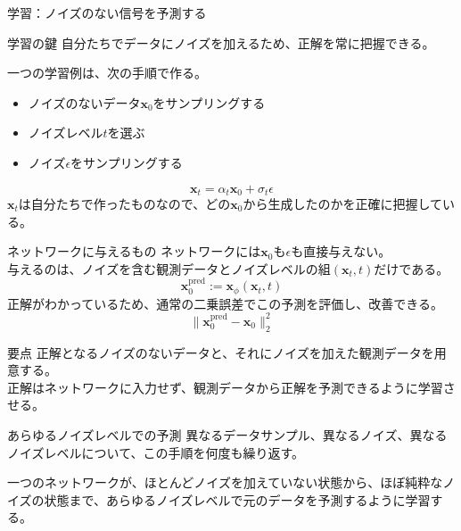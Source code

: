 \begin{frame}{学習：ノイズのない信号を予測する}
    \begin{block}{学習の鍵}
        自分たちでデータにノイズを加えるため、正解を常に把握できる。
    \end{block}
    一つの学習例は、次の手順で作る。
    \begin{itemize}
        \item ノイズのないデータ\(\boldsymbol{x}_{0}\)をサンプリングする
        \item ノイズレベル\(t\)を選ぶ
        \item ノイズ\(\epsilon\)をサンプリングする
    \end{itemize}
    \[
        \boldsymbol{x}_{t}=\alpha_{t}\boldsymbol{x}_{0}+\sigma_{t}\epsilon
    \]
    \(\boldsymbol{x}_{t}\)は自分たちで作ったものなので、どの\(\boldsymbol{x}_{0}\)から生成したのかを正確に把握している。
\end{frame}
\begin{frame}{ネットワークに与えるもの}
    ネットワークには\(\boldsymbol{x}_{0}\)も\(\epsilon\)も直接与えない。\\
    与えるのは、ノイズを含む観測データとノイズレベルの組\((\boldsymbol{x}_{t},t)\)だけである。
    \[
        \boldsymbol{x}_{0}^{\mathrm{pred}}:=\boldsymbol{x}_{\phi}(\boldsymbol{x}_{t},t)
    \]
    正解がわかっているため、通常の二乗誤差でこの予測を評価し、改善できる。
    \[
        \bigl\|\boldsymbol{x}_{0}^{\mathrm{pred}}-\boldsymbol{x}_{0}\bigr\|_{2}^{2}
    \]
    \begin{exampleblock}{要点}
        正解となるノイズのないデータと、それにノイズを加えた観測データを用意する。\\
        正解はネットワークに入力せず、観測データから正解を予測できるように学習させる。
    \end{exampleblock}
\end{frame}
\begin{frame}{あらゆるノイズレベルでの予測}
    異なるデータサンプル、異なるノイズ、異なるノイズレベルについて、この手順を何度も繰り返す。
    \vspace{0.8em}
    \begin{block}{}
        一つのネットワークが、ほとんどノイズを加えていない状態から、ほぼ純粋なノイズの状態まで、あらゆるノイズレベルで元のデータを予測するように学習する。
    \end{block}
\end{frame}
